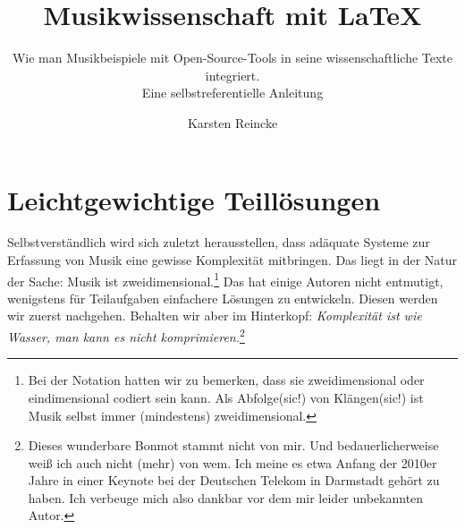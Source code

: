 \documentclass[
  DIV=calc,
  BCOR=5mm,
  11pt,
  headings=small,
  oneside,
  abstract=true,
  toc=bib,
  english,ngerman]{scrartcl}
\newcommand{\acc}[0]{\textit}
\begin{document}
\nocite{*}

\titlehead{\textit{mycsrf} und Musik}
\subject{Release }
\title{Musikwissenschaft mit \LaTeX}
\subtitle{Wie man Musikbeispiele mit Open-Source-Tools 
in seine wissenschaftliche Texte integriert.\\
{\small Eine selbstreferentielle Anleitung}}
\author{Karsten Reincke}


\maketitle



\footnotesize
\tableofcontents

\normalsize







\section{Leichtgewichtige Teillösungen}

Selbstverständlich wird sich zuletzt herausstellen, dass adäquate Systeme zur
Erfassung von Musik eine gewisse Komplexität mitbringen. Das liegt in der Natur
der Sache: Musik ist zweidimensional.\footnote{Bei der Notation hatten wir zu
bemerken, dass sie zweidimensional oder eindimensional codiert sein kann.
Als Abfolge(sic!) von Klängen(sic!) ist Musik selbst immer (mindestens)
zweidimensional.} Das hat einige Autoren nicht entmutigt, wenigstens für
Teilaufgaben einfachere Lösungen zu entwickeln. Diesen werden wir zuerst
nachgehen. Behalten wir aber im Hinterkopf: \acc{Komplexität ist wie Wasser, man
kann es nicht komprimieren.}\footnote{Dieses wunderbare Bonmot stammt nicht von
mir. Und bedauerlicherweise weiß ich auch nicht (mehr) von wem. Ich meine es
etwa Anfang der 2010er Jahre in einer Keynote bei der Deutschen Telekom in
Darmstadt gehört zu haben. Ich verbeuge mich also dankbar vor dem mir leider
unbekannten Autor.}



\end{document}
